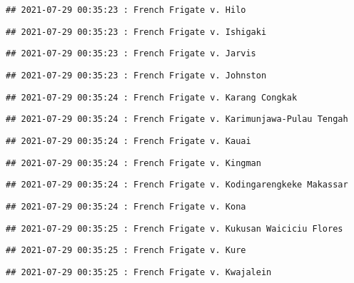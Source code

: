 \documentclass[
]{article}
\begin{document}
\begin{verbatim}
## 2021-07-29 00:35:23 : French Frigate v. Hilo
\end{verbatim}

\begin{verbatim}
## 2021-07-29 00:35:23 : French Frigate v. Ishigaki
\end{verbatim}

\begin{verbatim}
## 2021-07-29 00:35:23 : French Frigate v. Jarvis
\end{verbatim}

\begin{verbatim}
## 2021-07-29 00:35:23 : French Frigate v. Johnston
\end{verbatim}

\begin{verbatim}
## 2021-07-29 00:35:24 : French Frigate v. Karang Congkak
\end{verbatim}

\begin{verbatim}
## 2021-07-29 00:35:24 : French Frigate v. Karimunjawa-Pulau Tengah
\end{verbatim}

\begin{verbatim}
## 2021-07-29 00:35:24 : French Frigate v. Kauai
\end{verbatim}

\begin{verbatim}
## 2021-07-29 00:35:24 : French Frigate v. Kingman
\end{verbatim}

\begin{verbatim}
## 2021-07-29 00:35:24 : French Frigate v. Kodingarengkeke Makassar
\end{verbatim}

\begin{verbatim}
## 2021-07-29 00:35:24 : French Frigate v. Kona
\end{verbatim}

\begin{verbatim}
## 2021-07-29 00:35:25 : French Frigate v. Kukusan Waiciciu Flores
\end{verbatim}

\begin{verbatim}
## 2021-07-29 00:35:25 : French Frigate v. Kure
\end{verbatim}

\begin{verbatim}
## 2021-07-29 00:35:25 : French Frigate v. Kwajalein
\end{verbatim}
\end{document}
